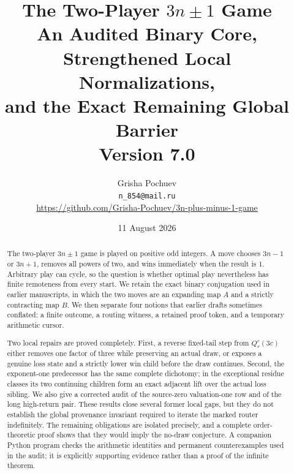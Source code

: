 \documentclass[11pt,a4paper]{article}
\title{\textbf{The Two-Player $3n\pm1$ Game}\\[2mm]
\large An Audited Binary Core, Strengthened Local Normalizations,\\
and the Exact Remaining Global Barrier\\[2mm]
\normalsize Version 7.0}
\author{Grisha Pochuev\\
\texttt{n\_854@mail.ru}\\
\url{https://github.com/Grisha-Pochuev/3n-plus-minus-1-game}}
\date{11 August 2026}
\theoremstyle{definition}
\theoremstyle{remark}
\begin{document}
\maketitle

\noindent
{}

\begin{abstract}
The two-player $3n\pm1$ game is played on positive odd integers.  A move
chooses $3n-1$ or $3n+1$, removes all powers of two, and wins immediately
when the result is $1$.  Arbitrary play can cycle, so the question is whether
optimal play nevertheless has finite remoteness from every start.  We retain
the exact binary conjugation used in earlier manuscripts, in which the two
moves are an expanding map $A$ and a strictly contracting map $B$.  We then
separate four notions that earlier drafts sometimes conflated: a finite
outcome, a routing witness, a retained proof token, and a temporary arithmetic
cursor.

Two local repairs are proved completely.  First, a reverse fixed-tail step
from $Q_r^e(3c)$ either removes one factor of three while preserving an
actual draw, or exposes a genuine loss state and a strictly lower win child
before the draw continues.  Second, the exponent-one predecessor has the
same complete dichotomy; in the exceptional residue classes its two
continuing children form an exact adjacent lift over the actual loss sibling.
We also give a corrected audit of the source-zero valuation-one row and of
the long high-return pair.  These results close several former local gaps,
but they do not establish the global provenance invariant required to
iterate the marked router indefinitely.  The remaining obligations are
isolated precisely, and a complete order-theoretic proof shows that they
would imply the no-draw conjecture.  A companion Python program checks the
arithmetic identities and permanent counterexamples used in the audit; it is
explicitly supporting evidence rather than a proof of the infinite theorem.
\end{abstract}
\end{document}
